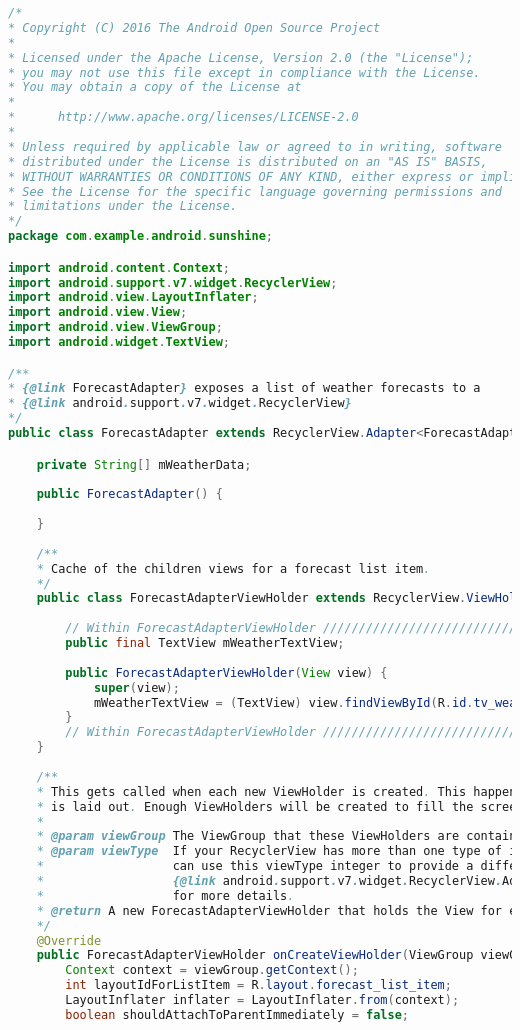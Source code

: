 \documentclass[12pt]{article} %
\begin{document}
\begin{lstlisting}[language=Java]
/*
* Copyright (C) 2016 The Android Open Source Project
*
* Licensed under the Apache License, Version 2.0 (the "License");
* you may not use this file except in compliance with the License.
* You may obtain a copy of the License at
*
*      http://www.apache.org/licenses/LICENSE-2.0
*
* Unless required by applicable law or agreed to in writing, software
* distributed under the License is distributed on an "AS IS" BASIS,
* WITHOUT WARRANTIES OR CONDITIONS OF ANY KIND, either express or implied.
* See the License for the specific language governing permissions and
* limitations under the License.
*/
package com.example.android.sunshine;

import android.content.Context;
import android.support.v7.widget.RecyclerView;
import android.view.LayoutInflater;
import android.view.View;
import android.view.ViewGroup;
import android.widget.TextView;

/**
* {@link ForecastAdapter} exposes a list of weather forecasts to a
* {@link android.support.v7.widget.RecyclerView}
*/
public class ForecastAdapter extends RecyclerView.Adapter<ForecastAdapter.ForecastAdapterViewHolder> {

	private String[] mWeatherData;
	
	public ForecastAdapter() {
		
	}
	
	/**
	* Cache of the children views for a forecast list item.
	*/
	public class ForecastAdapterViewHolder extends RecyclerView.ViewHolder {
		
		// Within ForecastAdapterViewHolder ///////////////////////////////////////////////////////
		public final TextView mWeatherTextView;
		
		public ForecastAdapterViewHolder(View view) {
			super(view);
			mWeatherTextView = (TextView) view.findViewById(R.id.tv_weather_data);
		}
		// Within ForecastAdapterViewHolder ///////////////////////////////////////////////////////
	}
	
	/**
	* This gets called when each new ViewHolder is created. This happens when the RecyclerView
	* is laid out. Enough ViewHolders will be created to fill the screen and allow for scrolling.
	*
	* @param viewGroup The ViewGroup that these ViewHolders are contained within.
	* @param viewType  If your RecyclerView has more than one type of item (which ours doesn't) you
	*                  can use this viewType integer to provide a different layout. See
	*                  {@link android.support.v7.widget.RecyclerView.Adapter#getItemViewType(int)}
	*                  for more details.
	* @return A new ForecastAdapterViewHolder that holds the View for each list item
	*/
	@Override
	public ForecastAdapterViewHolder onCreateViewHolder(ViewGroup viewGroup, int viewType) {
		Context context = viewGroup.getContext();
		int layoutIdForListItem = R.layout.forecast_list_item;
		LayoutInflater inflater = LayoutInflater.from(context);
		boolean shouldAttachToParentImmediately = false;
		

\end{lstlisting}
\end{document}
